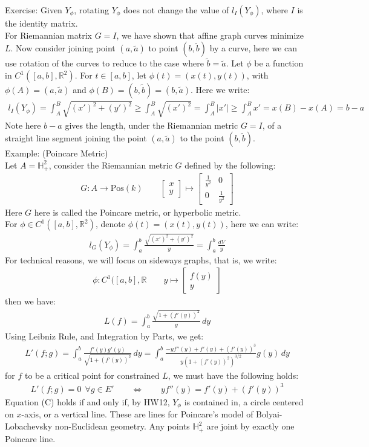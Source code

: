 \documentclass[11pt,oneside]{book}
\theoremstyle{break}
\theoremstyle{break}
\newcommand{\R}{\mathbb{R}}
\newcommand{\that}[1]{\widetilde{#1}}
\newcommand{\bmat}[1]{\begin{bmatrix} #1 \end{bmatrix}}
\newcommand{\example}{\color{green}Example: \color{black}}
\newcommand{\exercise}{\color{green}Exercise: \color{black}}
\begin{document}
\exercise Given $Y_{\phi}$, rotating $Y_{\phi}$ does not change the value of $l_I(Y_{\phi})$, where $I$ is the identity matrix.\\ 

For Riemannian matrix $G = I$, we have shown that affine graph curves minimize $L$. Now consider joining point $(a,\that{a})$ to point $(b,\that{b})$ by a curve, here we can use rotation of the curves to reduce to the case where $\that{b} = \that{a}$. Let $\phi$ be a function in $C^1([a,b],\R^2)$. For $t\in [a,b]$, let $\phi(t) = (x(t), y(t))$, with $\phi(A) = (a,\that{a})$ and $\phi(B) =(b,\that{b}) = (b,\that{a})$. Here we write:
\begin{align*}
l_I(Y_{\phi}) = \int_A^B \sqrt{(x')^2 + (y')^2} \geq \int_A^B \sqrt{(x')^2} = \int_A^B |x'| \geq \int_A^B x' = x(B) - x(A) = b-a
\end{align*}
Note here $b-a$ gives the length, under the Riemannian metric $G = I$, of a straight line segment joining the point $(a,\that{a})$ to the point $(b,\that{b})$.\\

\example (Poincare Metric)\\
Let $A = \mathbb{H}_+^2$, consider the Riemannian metric $G$ defined by the following:
\begin{align*}
G:A \to \text{Pos}(k) \qquad \bmat{x\\y}\mapsto \bmat{\frac{1}{y^2} & 0 \\ 0 & \frac{1}{y^2}}
\end{align*}
Here $G$ here is called the Poincare metric, or hyperbolic metric. \\
For $\phi\in C^1([a,b], \R^2)$, denote $\phi(t) = (x(t),y(t))$, here we can write:
\begin{align*}
l_G(Y_{\phi}) = \int_a^b \frac{\sqrt{(x')^2 + (y')^2}}{y} = \int_a^b \frac{dV}{y}
\end{align*}
For technical reasons, we will focus on sideways graphs, that is, we write:
\begin{align*}
\phi:C^1([a,b], \R \qquad y \mapsto \bmat{f(y) \\ y}
\end{align*}
then we have:
\begin{align*}
L(f) = \int_a^b \frac{\sqrt{1+(f'(y))^2}}{y}\, dy
\end{align*}
Using Leibniz Rule, and Integration by Parts, we get:
\begin{align*}
L'(f;g) = \int_a^b \frac{f'(y) g'(y)}{\sqrt{1+ (f'(y))^2}}\, dy = \int_a^b  \frac{-y f''(y) + f'(y) + (f'(y))^3}{y(1+(f'(y))^2)^{3/2}}g(y)\, dy
\end{align*}
for $f$ to be a critical point for constrained $L$, we must have the following holds:
\begin{align*}
L'(f;g) = 0 \ \ \forall g \in E' \qquad \iff \qquad yf''(y) = f'(y) + (f'(y))^3  \tag{C}
\end{align*}
Equation (C) holds if and only if, by HW12, $Y_{\phi}$ is contained in, a circle centered on $x$-axis, or a vertical line. These are lines for Poincare's model of Bolyai-Lobachevsky non-Euclidean geometry. Any points $\mathbb{H}_+^2$ are joint by exactly one Poincare line. \\
\end{document}
